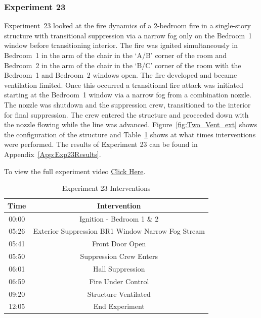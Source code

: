 \documentclass[12pt,oneside]{book}
\begin{document}
\clearpage

\subsubsection{Experiment 23}
Experiment~23 looked at the fire dynamics of a 2-bedroom fire in a single-story structure with transitional suppression via a narrow fog only on the Bedroom~1 window before transitioning interior. The fire was ignited simultaneously in Bedroom~1 in the arm of the chair in the `A/B' corner of the room and Bedroom~2 in the arm of the chair in the `B/C' corner of the room with the Bedroom~1 and Bedroom~2 windows open. The fire developed and became ventilation limited. Once this occurred a transitional fire attack was initiated starting at the Bedroom~1 window via a narrow fog from a combination nozzle. The nozzle was shutdown and the suppression crew, transitioned to the interior for final suppression. The crew entered the structure and proceeded down with the nozzle flowing while the line was advanced. Figure~\ref{fig:Two_Vent_ext} shows the configuration of the structure and Table~\ref{Table:Exp23Interventions} shows at what times interventions were performed. The results of Experiment 23 can be found in Appendix~\ref{App:Exp23Results}. 

To view the full experiment video \href{https://player.vimeo.com/video/170499625?autoplay=1}{Click Here}.

\begin{table}[H]
	\centering
	\caption{Experiment 23 Interventions}
	\begin{tabular}{|c|c|} 
		\hline
		Time & Intervention \\ \hline \hline
		00:00 & Ignition - Bedroom 1 \& 2 \\ \hline
		05:26 & Exterior Suppression BR1 Window Narrow Fog Stream \\ \hline
		05:41 & Front Door Open \\ \hline
		05:50 & Suppression Crew Enters\\ \hline
		06:01 & Hall Suppression \\ \hline 
		06:59 & Fire Under Control \\ \hline
		09:20 & Structure Ventilated \\ \hline
		12:05 & End Experiment\\ \hline
	\end{tabular}
	\label{Table:Exp23Interventions}
\end{table}

\clearpage
\end{document}
